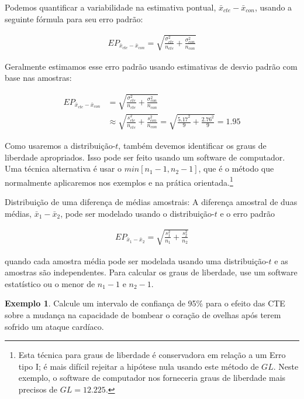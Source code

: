 \documentclass[
]{book}
\theoremstyle{definition}
\theoremstyle{definition}
\newtheorem{example}{Exemplo}[chapter]
\theoremstyle{definition}
\theoremstyle{definition}
\theoremstyle{remark}
\begin{document}
Podemos quantificar a variabilidade na estimativa pontual, \(\bar{x}_{cte} - \bar{x}_{con}\), usando a seguinte fórmula para seu erro padrão:

\begin{eqnarray*}
EP_{\bar{x}_{cte} - \bar{x}_{con}} = \sqrt{\frac{\sigma_{cte}^2}{n_{cte}} + \frac{\sigma_{con}^2}{n_{con}}}
\end{eqnarray*}

Geralmente estimamos esse erro padrão usando estimativas de desvio padrão com base nas amostras:

\begin{align*}
EP_{\bar{x}_{cte} - \bar{x}_{con}}
    &= \sqrt{\frac{\sigma_{cte}^2}{n_{cte}} + \frac{\sigma_{con}^2}{n_{con}}} \\
    &\approx \sqrt{\frac{s_{cte}^2}{n_{cte}} + \frac{s_{con}^2}{n_{con}}}
    = \sqrt{\frac{5.17^2}{9} + \frac{2.76^2}{9}} = 1.95
\end{align*}

Como usaremos a distribuição-\(t\), também devemos identificar os graus de liberdade apropriados. Isso pode ser feito usando um software de computador. Uma técnica alternativa é usar o \(min[n_1 - 1, n_2 - 1]\), que é o método que normalmente aplicaremos nos exemplos e na prática orientada.\footnote{Esta técnica para graus de liberdade é conservadora em relação a um Erro tipo I; é mais difícil rejeitar a hipótese nula usando este método de \(GL\). Neste exemplo, o software de computador nos forneceria graus de liberdade mais precisos de \(GL = 12.225\).}

Distribuição de uma diferença de médias amostrais: A diferença amostral de duas médias, \(\bar{x}_1 - \bar{x}_2\), pode ser modelado usando o distribuição-\(t\) e o erro padrão

\begin{eqnarray}
\textstyle
EP_{\bar{x}_{1} - \bar{x}_{2}} = \sqrt{\frac{s_1^2}{n_1} + \frac{s_2^2}{n_2}}
\label{eq:seOfDifferenceInMeans}
\end{eqnarray}

quando cada amostra média pode ser modelada usando uma distribuição-\(t\) e as amostras são independentes. Para calcular os graus de liberdade, use um software estatístico ou o menor de \(n_1 - 1\) e \(n_2 - 1\).

\begin{example}
\protect\hypertarget{exm:unnamed-chunk-201}{}{\label{exm:unnamed-chunk-201} }Calcule um intervalo de confiança de 95\% para o efeito das CTE sobre a mudança na capacidade de bombear o coração de ovelhas após terem sofrido um ataque cardíaco.
\end{example}
\end{document}
